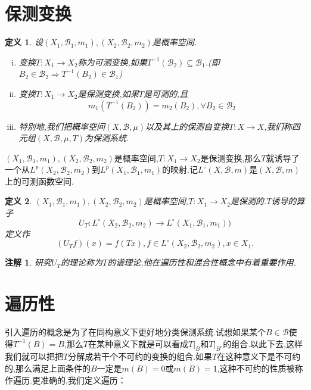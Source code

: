 \documentclass[a4paper,11pt,oneside]{book}
\newtheorem{definition}{\textbf{\hspace{0.7cm}定义}}[section]
\newtheorem{remark}{\textbf{\hspace{0.7cm}注解}}[section]
\newcommand{\ms}[1]{\mathscr{#1}}
\begin{document}
\section{保测变换}
\begin{definition}
设$(X_1,\ms{B}_1,m_1),(X_2,\mathscr{B}_2,m_2)$是概率空间.
\begin{enumerate}[(i)]
\item 变换$T:X_1 \rightarrow X_2$称为可测变换,如果$T^{-1}(\mathscr{B}_2) \subseteq \mathscr{B}_1$.(即\
$B_2 \in \mathscr{B}_2\Rightarrow T^{-1}(B_2) \in \mathscr{B}_1$)
\item 变换$T:X_1 \rightarrow X_2$是保测变换,如果$T$是可测的,且
$$m_1(T^{-1}(B_2))=m_2(B_2), \forall B_2 \in \mathscr{B}_2$$
\item 特别地,我们把概率空间$(X,\ms{B},\mu)$以及其上的保测自变换$T:X\rightarrow X$,我们称四元组$(X,\ms{B},\mu,T)$为保测系统.
\end{enumerate}
\end{definition}



$(X_1,\mathscr{B}_1,m_1),(X_2,\mathscr{B}_2,m_2)$是概率空间,$T:X_1 \rightarrow X_2$是保测变换,那么$T$就诱导了一个从$L^p(X_2,\mathscr{B}_2,m_2)$到$L^p(X_1,\mathscr{B}_1,m_1)$的映射.记$L^{\circ}(X,\ms{B},m)$是$(X,\ms{B},m)$上的可测函数空间.

\begin{definition}
$(X_1,\mathscr{B}_1,m_1),(X_2,\mathscr{B}_2,m_2)$是概率空间,$T:X_1 \rightarrow X_2$是保测的.$T$诱导的算子$$U_T:L^{\circ}(X_2,\ms{B}_2,m_2)\rightarrow L^{\circ}(X_1,\ms{B}_1,m_1))$$定义作$$(U_Tf)(x)=f(Tx),f\in L^{\circ}(X_2,\ms{B}_2,m_2),x\in X_1.$$

\end{definition}
\begin{remark}
研究$U_T$的理论称为$T$的谱理论,他在遍历性和混合性概念中有着重要作用.
\end{remark}



\section{遍历性}
引入遍历的概念是为了在同构意义下更好地分类保测系统.试想如果某个$B\in\ms{B}$使得$T^{-1}(B)=B$,那么$T$在某种意义下就是可以看成$T|_B$和$T|_{B^{c}}$的组合.以此下去,这样我们就可以把把$T$分解成若干个不可约的变换的组合.如果$T$在这种意义下是不可约的,那么满足上面条件的$B$一定是$m(B)=0$或$m(B)=1$,这种不可约的性质被称作遍历.更准确的,我们定义遍历：
\end{document}
